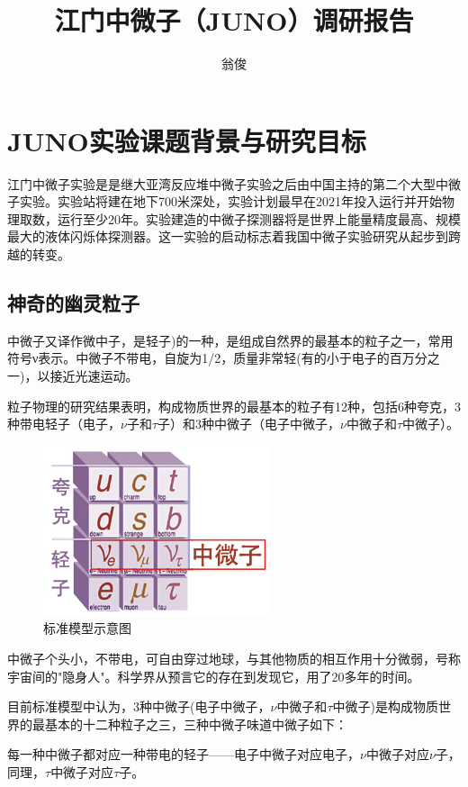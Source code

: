 \documentclass[10pt,a4paper]{article}
\author{翁俊}
\title{江门中微子（JUNO）调研报告}
\begin{document}
\maketitle
\newpage
\tableofcontents
\newpage

\section{JUNO实验课题背景与研究目标}
\indent 江门中微子实验是是继大亚湾反应堆中微子实验之后由中国主持的第二个大型中微子实验。实验站将建在地下700米深处，实验计划最早在2021年投入运行并开始物理取数，运行至少20年。实验建造的中微子探测器将是世界上能量精度最高、规模最大的液体闪烁体探测器。这一实验的启动标志着我国中微子实验研究从起步到跨越的转变。
	
	
\subsection{神奇的幽灵粒子}
中微子又译作微中子，是轻子)的一种，是组成自然界的最基本的粒子之一，常用符号ν表示。中微子不带电，自旋为1/2，质量非常轻(有的小于电子的百万分之一)，以接近光速运动。


粒子物理的研究结果表明，构成物质世界的最基本的粒子有12种，包括6种夸克，3种带电轻子（电子，$\nu$子和$\tau$子）和3种中微子（电子中微子，$\nu$中微子和$\tau$中微子）。

\begin{figure}[ht]
 \centering
 \includegraphics[height=5cm]{images/standarmodel.jpg}
 \caption{标准模型示意图}
 \label{fig:singleblock}
\end{figure}

中微子个头小，不带电，可自由穿过地球，与其他物质的相互作用十分微弱，号称宇宙间的"隐身人"。科学界从预言它的存在到发现它，用了20多年的时间。

目前标准模型中认为，3种中微子(电子中微子，$\nu$中微子和$\tau$中微子)是构成物质世界的最基本的十二种粒子之三，三种中微子味道中微子如下：

每一种中微子都对应一种带电的轻子——电子中微子对应电子，$\nu$中微子对应$\nu$子，同理，$\tau$中微子对应$\tau$子。
\end{document}
